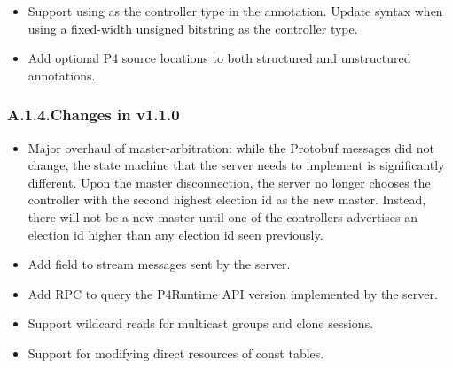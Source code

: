 \documentclass[11pt]{article}
\begin{document}
{\begin{itemize}[noitemsep,topsep=\mdcompacttopsep]
\item{}Support using  as the controller type in the 
annotation. Update syntax when using a fixed-width unsigned bitstring as the
controller type.%

\item{}Add optional P4 source locations to both structured and unstructured
annotations.%
\end{itemize}%

\subsubsection{A.1.4.\hspace*{0.5em}Changes in v1.1.0}\label{sec-changes-in-v110}%

\begin{itemize}[noitemsep,topsep=\mdcompacttopsep]%

\item{}Major overhaul of master-arbitration: while the Protobuf messages did not
change, the state machine that the server needs to implement is significantly
different. Upon the master disconnection, the server no longer chooses the
controller with the second highest election id as the new master. Instead,
there will not be a new master until one of the controllers advertises an
election id higher than any election id seen previously.%

\item{}Add  field to stream messages sent by the server.%

\item{}Add  RPC to query the P4Runtime API version implemented by the
server.%

\item{}Support wildcard reads for multicast groups and clone sessions.%

\item{}Support for modifying direct resources of const tables.%


\end{itemize}}
\end{document}
